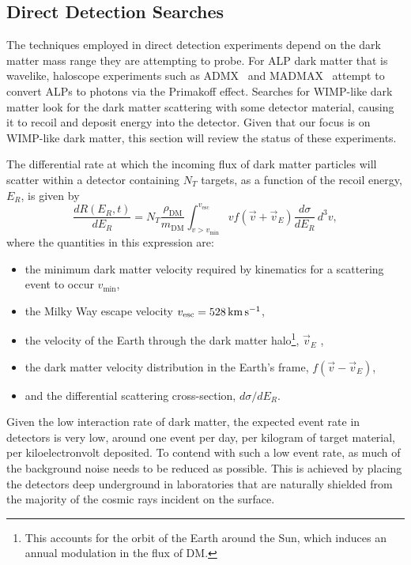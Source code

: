 \subsection{Direct Detection Searches}
\label{ch1:subsec:DDsearches}
The techniques employed in direct detection experiments depend on the dark matter mass range they are attempting to probe.
For ALP dark matter that is wavelike, haloscope experiments 
such as ADMX~\cite{ADMX:2009iij_SQUIDbasedmicrowavecavity} and MADMAX~\cite{MADMAX:2019pub_mar_Newexperimentalapproach} 
attempt to convert ALPs to photons via the Primakoff effect. 
Searches for WIMP-like dark matter look for the dark matter scattering with some detector
material, causing it to recoil and deposit energy into the detector. Given that our focus is on WIMP-like dark matter, 
this section will review the status of these experiments.

The differential rate at which the incoming flux of dark matter particles will scatter within a detector containing $N_T$ targets, as a function of the recoil energy, $E_R$, is given by
\begin{equation}
    \frac{d R(E_R, t)}{dE_R} = N_T \frac{\rho_\mathrm{DM}}{m_\mathrm{DM}}\int_{v>v_\mathrm{min}}^{v_\mathrm{esc}}v f(\vec{v} + \vec{v}_E)\frac{d\sigma}{dE_R}\,d^3v,
    \label{ch1:eq:DD_rate}
\end{equation}
 where the quantities in this expression are:
\begin{itemize}
    \item the minimum dark matter velocity required by kinematics for a scattering event to occur $v_\mathrm{min}$,
    \item the Milky Way escape velocity $v_\mathrm{esc} = 528{\rm \,km}{\rm \,s}^{-1}$,
    \item the velocity of the Earth through the dark matter halo\footnote{This accounts for the orbit of the Earth around the Sun, which induces an annual modulation in the flux of DM.}, $\vec{v}_E$ ,
    \item the dark matter velocity distribution in the Earth's frame, $f(\vec{v} - \vec{v}_E)$, 
    \item and the differential scattering cross-section, $d\sigma/dE_R$.
\end{itemize}
Given the low interaction rate of dark matter, the expected event rate in detectors is very low, around one event per day, per kilogram of target material, per kiloelectronvolt deposited. To contend with such a low event rate, as much of the background noise needs to be reduced as possible. This is achieved by placing the detectors deep underground in laboratories that are naturally shielded from the majority of the cosmic rays incident on the surface. 

